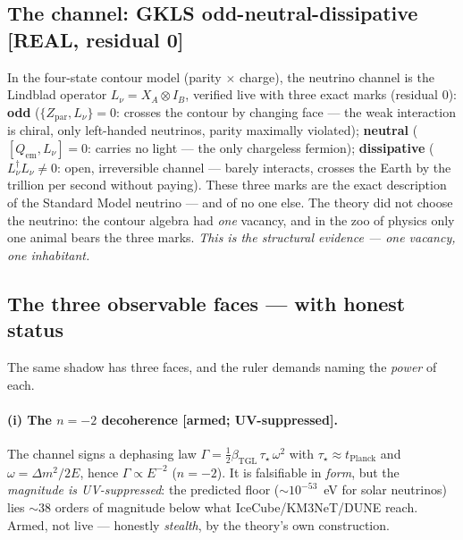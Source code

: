\documentclass[11pt]{article}
\newcommand{\bTGL}{\beta_{\mathrm{TGL}}}\newcommand{\Msun}{M_{\odot}}\newcommand{\TGL}{\mathrm{TGL}}
\theoremstyle{definition}\newtheorem{deriv}{Derivation}
\begin{document}
\subsection*{The channel: GKLS odd-neutral-dissipative \textsf{[REAL, residual 0]}}

In the four-state contour model (parity $\times$ charge), the neutrino channel is the Lindblad operator $L_\nu=X_A\otimes I_B$, verified live with three exact marks (residual $0$): \textbf{odd} ($\{Z_{\text{par}},L_\nu\}=0$: crosses the contour by changing face --- the weak interaction is chiral, only left-handed neutrinos, parity maximally violated); \textbf{neutral} ($[Q_{\text{em}},L_\nu]=0$: carries no light --- the only chargeless fermion); \textbf{dissipative} ($L_\nu^\dagger L_\nu\neq0$: open, irreversible channel --- barely interacts, crosses the Earth by the trillion per second without paying). These three marks are the exact description of the Standard Model neutrino --- and of no one else. The theory did not choose the neutrino: the contour algebra had \emph{one} vacancy, and in the zoo of physics only one animal bears the three marks. \emph{This is the structural evidence --- one vacancy, one inhabitant.}

\subsection*{The three observable faces --- with honest status}

The same shadow has three faces, and the ruler demands naming the \emph{power} of each.

\paragraph{(i) The $n=-2$ decoherence \textsf{[armed; UV-suppressed].}} The channel signs a dephasing law $\Gamma=\tfrac12\bTGL\,\tau_\star\,\omega^2$ with $\tau_\star\approx t_{\text{Planck}}$ and $\omega=\Delta m^2/2E$, hence $\Gamma\propto E^{-2}$ ($n=-2$). It is falsifiable in \emph{form}, but the \emph{magnitude is UV-suppressed}: the predicted floor ($\sim10^{-53}$~eV for solar neutrinos) lies $\sim38$ orders of magnitude below what IceCube/KM3NeT/DUNE reach. Armed, not live --- honestly \emph{stealth}, by the theory's own construction.
\end{document}
